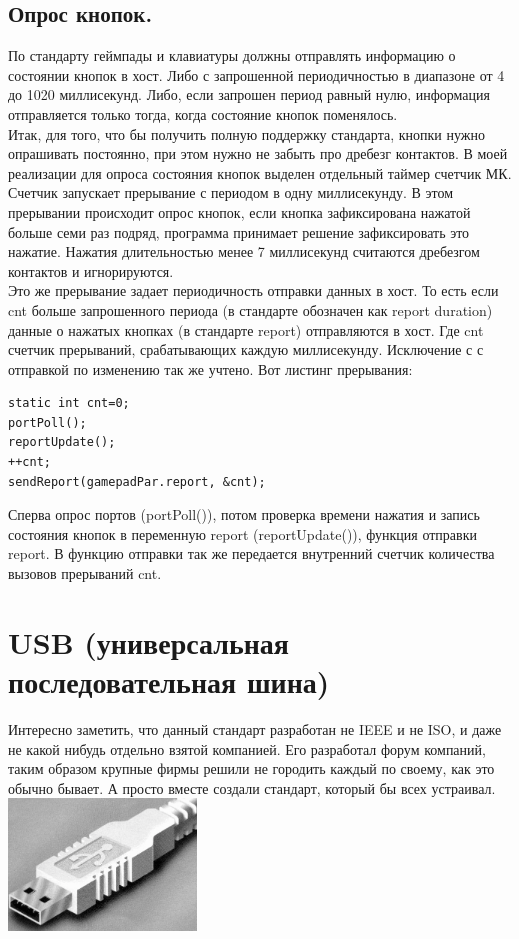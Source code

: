 \documentclass[12pt,a4paper]{article}
\begin{document}
\subsection{Опрос кнопок.}
    По стандарту геймпады и клавиатуры должны отправлять информацию о состоянии
    кнопок в хост. Либо с запрошенной периодичностью в диапазоне
    от 4 до 1020 миллисекунд. Либо, если запрошен период равный нулю, информация
    отправляется только тогда, когда состояние кнопок поменялось.\\
    Итак, для того, что бы получить полную поддержку стандарта, кнопки нужно
    опрашивать постоянно, при этом нужно не забыть про дребезг контактов.
    В моей реализации для опроса состояния кнопок выделен отдельный таймер
    счетчик МК. Счетчик запускает прерывание с периодом в одну миллисекунду.
    В этом прерывании происходит опрос кнопок, если кнопка зафиксирована
    нажатой больше семи раз подряд, программа принимает решение зафиксировать
    это нажатие. Нажатия длительностью менее 7 миллисекунд считаются дребезгом
    контактов и игнорируются.\\
    Это же прерывание задает периодичность отправки данных в хост. То есть
    если cnt больше запрошенного периода (в стандарте обозначен как report duration)
    данные о нажатых кнопках (в стандарте report) отправляются в хост. Где cnt
    счетчик прерываний, срабатывающих каждую миллисекунду. Исключение с
    с отправкой по изменению так же учтено. Вот листинг прерывания:
\lstset{language=c}
\begin{lstlisting}
static int cnt=0;
portPoll();
reportUpdate();
++cnt;
sendReport(gamepadPar.report, &cnt);
\end{lstlisting}
    Сперва опрос портов (portPoll()), потом проверка времени нажатия и запись
    состояния кнопок в переменную report (reportUpdate()), функция отправки
    report. В функцию отправки так же передается внутренний счетчик количества
    вызовов прерываний cnt.


\section{USB (универсальная последовательная шина)}
    Интересно заметить, что данный стандарт разработан не IEEE и не ISO, и
    даже не какой нибудь отдельно взятой компанией. Его разработал форум
    компаний, таким образом крупные фирмы решили не городить каждый по своему,
    как это обычно бывает. А просто вместе создали стандарт, который
    бы всех устраивал.\\
\includegraphics[width=5cm]{plug.png}\\
\end{document}
